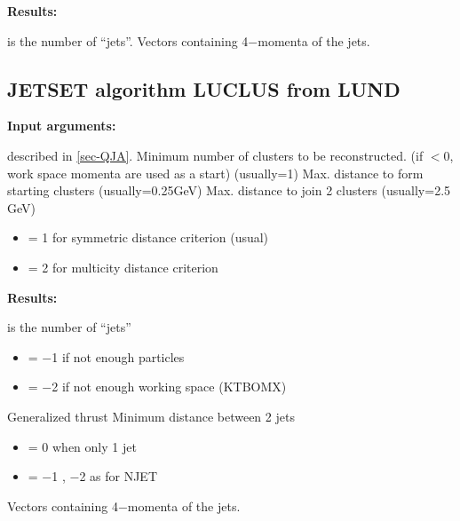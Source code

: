 {\bf Results:}
\begin{indentlist}{ 2.50cm}{ 2.75cm}
is the number of ``jets''.
Vectors containing 4$-$momenta of the jets.
\end{indentlist}
 
\subsection{\label{sec-QJLU}JETSET algorithm LUCLUS from LUND}
\par
{}
\par
\par
{\bf Input arguments:}
\begin{indentlist}{ 2.50cm}{ 2.75cm}
described in \ref{sec-QJA}.
Minimum number of clusters to be reconstructed.
(if $<$0, work space momenta are used as a start)
(usually=1)
Max. distance to form starting clusters (usually=0.25GeV)
Max. distance to join 2 clusters (usually=2.5 GeV)
\begin{itemize}
\item = 1 for symmetric distance criterion (usual)
\item = 2 for multicity distance criterion
\end{itemize}
\end{indentlist}
 
{\bf Results:}
\begin{indentlist}{ 2.50cm}{ 2.75cm}
 is the number of ``jets''
\begin{itemize}
\item = $-$1 if not enough particles
\item = $-$2 if not enough working space (KTBOMX)
\end{itemize}
Generalized thrust
Minimum distance between 2 jets
\begin{itemize}
\item = 0  when only 1 jet
\item = $-$1 , $-$2 as for NJET
\end{itemize}
Vectors containing 4$-$momenta of the jets.
\end{indentlist}
 
